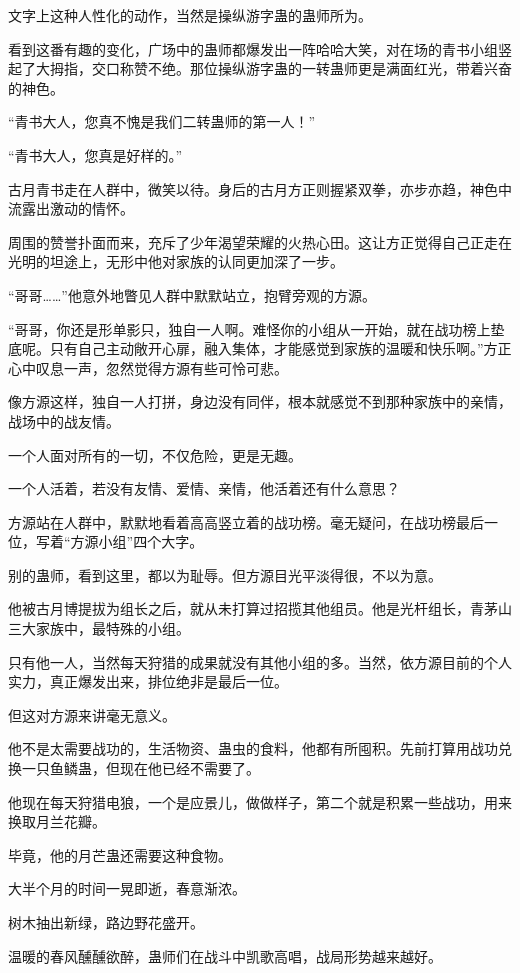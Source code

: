 \begin{this_body}
文字上这种人性化的动作，当然是操纵游字蛊的蛊师所为。

看到这番有趣的变化，广场中的蛊师都爆发出一阵哈哈大笑，对在场的青书小组竖起了大拇指，交口称赞不绝。那位操纵游字蛊的一转蛊师更是满面红光，带着兴奋的神色。

“青书大人，您真不愧是我们二转蛊师的第一人！”

“青书大人，您真是好样的。”

古月青书走在人群中，微笑以待。身后的古月方正则握紧双拳，亦步亦趋，神色中流露出激动的情怀。

周围的赞誉扑面而来，充斥了少年渴望荣耀的火热心田。这让方正觉得自己正走在光明的坦途上，无形中他对家族的认同更加深了一步。

“哥哥……”他意外地瞥见人群中默默站立，抱臂旁观的方源。

“哥哥，你还是形单影只，独自一人啊。难怪你的小组从一开始，就在战功榜上垫底呢。只有自己主动敞开心扉，融入集体，才能感觉到家族的温暖和快乐啊。”方正心中叹息一声，忽然觉得方源有些可怜可悲。

像方源这样，独自一人打拼，身边没有同伴，根本就感觉不到那种家族中的亲情，战场中的战友情。

一个人面对所有的一切，不仅危险，更是无趣。

一个人活着，若没有友情、爱情、亲情，他活着还有什么意思？

方源站在人群中，默默地看着高高竖立着的战功榜。毫无疑问，在战功榜最后一位，写着“方源小组”四个大字。

别的蛊师，看到这里，都以为耻辱。但方源目光平淡得很，不以为意。

他被古月博提拔为组长之后，就从未打算过招揽其他组员。他是光杆组长，青茅山三大家族中，最特殊的小组。

只有他一人，当然每天狩猎的成果就没有其他小组的多。当然，依方源目前的个人实力，真正爆发出来，排位绝非是最后一位。

但这对方源来讲毫无意义。

他不是太需要战功的，生活物资、蛊虫的食料，他都有所囤积。先前打算用战功兑换一只鱼鳞蛊，但现在他已经不需要了。

他现在每天狩猎电狼，一个是应景儿，做做样子，第二个就是积累一些战功，用来换取月兰花瓣。

毕竟，他的月芒蛊还需要这种食物。

大半个月的时间一晃即逝，春意渐浓。

树木抽出新绿，路边野花盛开。

温暖的春风醺醺欲醉，蛊师们在战斗中凯歌高唱，战局形势越来越好。


\end{this_body}
